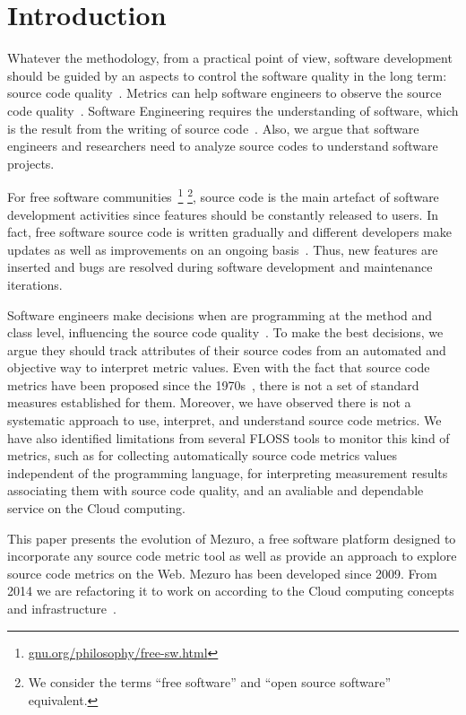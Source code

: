 \section{Introduction}
\label{introduction}

Whatever the methodology, from a practical point of view, software development
should be guided by an aspects to control the software quality in the long
term: source code quality~\cite{martin2008}. Metrics can help software
engineers to observe the source code quality~\cite{SEI88}. Software Engineering
requires the understanding of software, which is the result from the writing of
source code~\cite{martin2008}. Also, we argue that software engineers and
researchers need to analyze source codes to understand software projects.

For free software communities~\footnote{\url{gnu.org/philosophy/free-sw.html}}
\footnote{We consider the terms ``free software'' and ``open source software''
equivalent.}, source code is the main artefact of software development
activities since features should be constantly released to users. In fact,
free software source code is written gradually and different developers make
updates as well as improvements on an ongoing basis~\cite{martin2008}. Thus,
new features are inserted and bugs are resolved during software development and
maintenance iterations.

Software engineers make decisions when are programming at the method and class
level, influencing the source code quality~\cite{beck2007}. To make the best
decisions, we argue they should track attributes of their source codes from an
automated and objective way to interpret metric values. Even with the fact that
source code metrics have been proposed since the 1970s~\cite{SEI88}, there is
not a set of standard measures established for them.  Moreover, we have
observed there is not a systematic approach to use, interpret, and understand
source code metrics. We have also identified limitations from several FLOSS
tools to monitor this kind of metrics, such as for collecting automatically
source code metrics values independent of the programming language, for
interpreting measurement results associating them with source code quality, and
an avaliable and dependable service on the Cloud computing.

This paper presents the evolution of Mezuro, a free software platform
designed to incorporate any source code metric tool as well as provide an
approach to explore source code metrics on the Web. Mezuro has been developed
since 2009. From 2014 we are refactoring it to work on according to the Cloud
computing concepts and infrastructure~\cite{louridas2010}.

